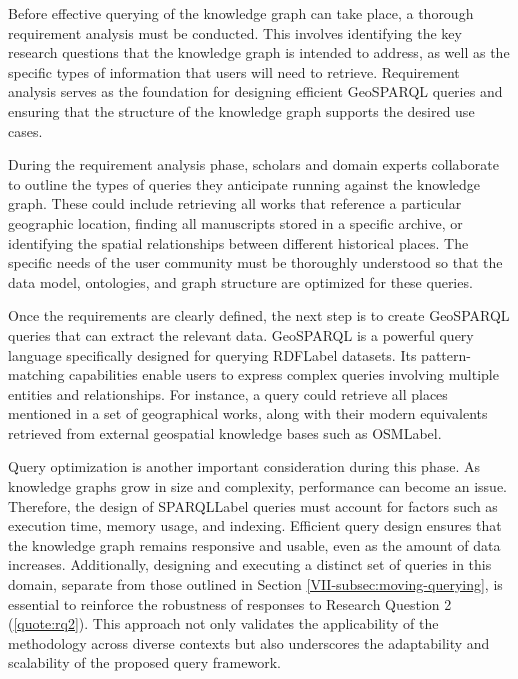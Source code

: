 Before effective querying of the knowledge graph can take place, a thorough requirement analysis must be conducted. This involves identifying the key research questions that the knowledge graph is intended to address, as well as the specific types of information that users will need to retrieve. Requirement analysis serves as the foundation for designing efficient GeoSPARQL queries and ensuring that the structure of the knowledge graph supports the desired use cases.

During the requirement analysis phase, scholars and domain experts collaborate to outline the types of queries they anticipate running against the knowledge graph. These could include retrieving all works that reference a particular geographic location, finding all manuscripts stored in a specific archive, or identifying the spatial relationships between different historical places. The specific needs of the user community must be thoroughly understood so that the data model, ontologies, and graph structure are optimized for these queries.

Once the requirements are clearly defined, the next step is to create GeoSPARQL queries that can extract the relevant data. GeoSPARQL is a powerful query language specifically designed for querying \acrshort{RDFLabel} datasets. Its pattern-matching capabilities enable users to express complex queries involving multiple entities and relationships. For instance, a query could retrieve all places mentioned in a set of geographical works, along with their modern equivalents retrieved from external geospatial knowledge bases such as \acrshort{OSMLabel}.

Query optimization is another important consideration during this phase. As knowledge graphs grow in size and complexity, performance can become an issue. Therefore, the design of \acrshort{SPARQLLabel} queries must account for factors such as execution time, memory usage, and indexing. Efficient query design ensures that the knowledge graph remains responsive and usable, even as the amount of data increases. Additionally, designing and executing a distinct set of queries in this domain, separate from those outlined in Section \ref{VII-subsec:moving-querying}, is essential to reinforce the robustness of responses to Research Question 2 (\ref{quote:rq2}). This approach not only validates the applicability of the methodology across diverse contexts but also underscores the adaptability and scalability of the proposed query framework.


